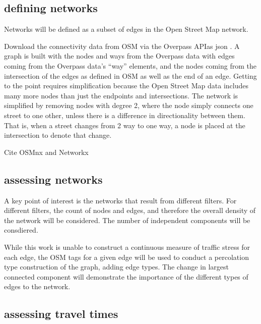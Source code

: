 \documentclass[11pt]{article} %
\begin{document}
\subsection{defining networks}

Networks will be defined as a subset of edges in the Open Street Map network. 

Download the connectivity data from OSM via the Overpass APIas json . A graph is built with the nodes and ways from the Overpass data with edges coming from the Overpass data's ``way'' elements, and the nodes coming from the intersection of the edges as defined in OSM as well as the end of an edge. Getting to the point requires simplification because the Open Street Map data includes many more nodes than just the endpoints and intersections. The network is simplified by removing nodes with degree 2, where the node simply connects one street to one other, unless there is a difference in directionality between them. That is, when a street changes from 2 way to one way, a node is placed at the intersection to denote that change. 

Cite OSMnx \cite{osmnx} and Networkx \cite{networkx}


\subsection{assessing networks}

A key point of interest is the networks that result from different filters. For different filters, the count of nodes and edges, and therefore the overall density of the network will be considered. The number of independent components will be consdiered. 

While this work is unable to construct a continuous measure of traffic stress for each edge, the OSM tags for a given edge will be used to conduct a percolation type construction of the graph, adding edge types. The change in largest connected component will demonstrate the importance of the different types of edges to the network. 

\subsection{assessing travel times}
\end{document}
